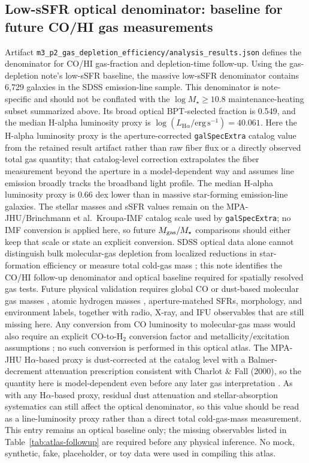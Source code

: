 \documentclass[twocolumn]{aastex631}
\begin{document}
\subsection{Low-sSFR optical denominator: baseline for future CO/HI gas measurements}\label{sec:gas-depletion}
Artifact \texttt{m3\_p2\_gas\_depletion\_efficiency/analysis\_results.json} defines the denominator for CO/HI gas-fraction and depletion-time follow-up. Using the gas-depletion note's low-sSFR baseline, the massive low-sSFR denominator contains 6,729 galaxies in the SDSS emission-line sample. This denominator is note-specific and should not be conflated with the \(\log M_\star \geq 10.8\) maintenance-heating subset summarized above. Its broad optical BPT-selected fraction is 0.549, and the median H-alpha luminosity proxy is \(\log (L_{\mathrm{H}\alpha}/\mathrm{erg\,s^{-1}}) = 40.061\). Here the H-alpha luminosity proxy is the aperture-corrected \texttt{galSpecExtra} catalog value from the retained result artifact rather than raw fiber flux or a directly observed total gas quantity; that catalog-level correction extrapolates the fiber measurement beyond the aperture in a model-dependent way and assumes line emission broadly tracks the broadband light profile. The median H-alpha luminosity proxy is 0.66 dex lower than in massive star-forming emission-line galaxies. The stellar masses and sSFR values remain on the MPA-JHU/Brinchmann et al.\ Kroupa-IMF catalog scale used by \texttt{galSpecExtra}; no IMF conversion is applied here, so future \(M_{\rm gas}/M_\star\) comparisons should either keep that scale or state an explicit conversion. SDSS optical data alone cannot distinguish bulk molecular-gas depletion from localized reductions in star-formation efficiency or measure total cold-gas mass \citep{tacconi2018}; this note identifies the CO/HI follow-up denominator and optical baseline required for spatially resolved gas tests. Future physical validation requires global CO or dust-based molecular gas masses \citep[e.g., xCOLD GASS;][]{xcoldgass2017}, atomic hydrogen masses \citep[e.g., xGASS;][]{xgass2018}, aperture-matched SFRs, morphology, and environment labels, together with radio, X-ray, and IFU observables that are still missing here. Any conversion from CO luminosity to molecular-gas mass would also require an explicit CO-to-H$_2$ conversion factor and metallicity/excitation assumptions \citep{bolatto2013}; no such conversion is performed in this optical atlas. The MPA-JHU H$\alpha$-based proxy is dust-corrected at the catalog level with a Balmer-decrement attenuation prescription consistent with Charlot \& Fall (2000), so the quantity here is model-dependent even before any later gas interpretation \citep{charlotfall2000}. As with any H$\alpha$-based proxy, residual dust attenuation and stellar-absorption systematics can still affect the optical denominator, so this value should be read as a line-luminosity proxy rather than a direct total cold-gas-mass measurement. This entry remains an optical baseline only; the missing observables listed in Table~\ref{tab:atlas-followup} are required before any physical inference. No mock, synthetic, fake, placeholder, or toy data were used in compiling this atlas.
\end{document}
